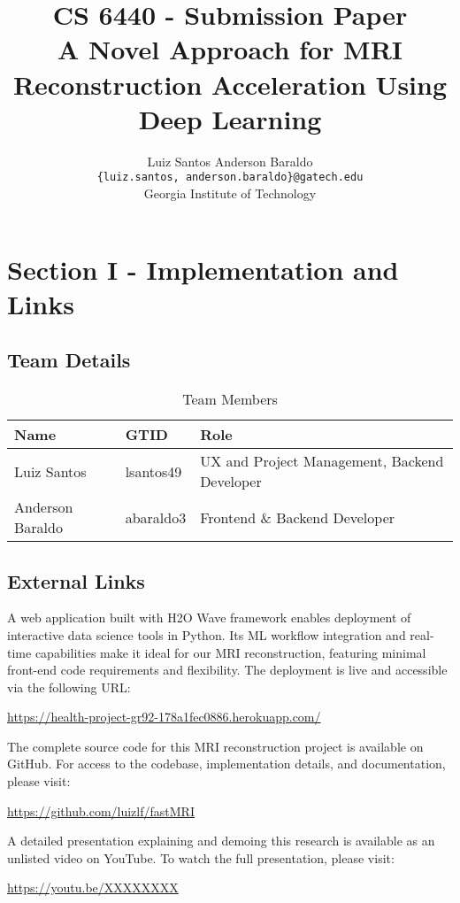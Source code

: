 \documentclass[
	letterpaper, %
]{jdf}
\title{CS 6440 - Submission Paper \\ A Novel Approach for MRI Reconstruction Acceleration Using Deep Learning}
\author{Luiz Santos \qquad Anderson Baraldo \\
{\tt\small \{luiz.santos, anderson.baraldo\}@gatech.edu} \\ %
Georgia Institute of Technology}
\begin{document}

\maketitle

\section{Section I - Implementation and Links}

\subsection{Team Details}

\begin{table}[ht]
\centering
\begin{tabular}{|l|l|l|}
\hline
\textbf{Name} & \textbf{GTID} & \textbf{Role} \\
\hline
Luiz Santos & lsantos49 & UX and Project Management, Backend Developer \\
\hline
Anderson Baraldo & abaraldo3 & Frontend \& Backend Developer \\
\hline
\end{tabular}
\caption{Team Members}
\label{tab:team_members}
\end{table}

\subsection{External Links}

A web application built with H2O Wave framework enables deployment of interactive data science tools in Python. Its ML workflow integration and real-time capabilities make it ideal for our MRI reconstruction, featuring minimal front-end code requirements and flexibility.
The deployment is live and accessible via the following URL:

\url{https://health-project-gr92-178a1fec0886.herokuapp.com/}

The complete source code for this MRI reconstruction project is available on GitHub. For access to the codebase, implementation details, and documentation, please visit:

\url{https://github.com/luizlf/fastMRI}

A detailed presentation explaining and demoing this research is available as an unlisted video on YouTube. To watch the full presentation, please visit:

\url{https://youtu.be/XXXXXXXX}
\end{document}
